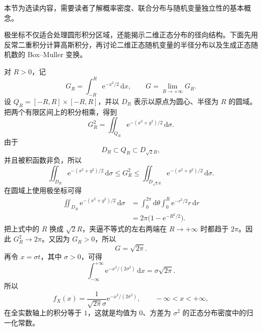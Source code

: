 \documentclass[fontset=fandol]{ctexart}
\newenvironment{extra}{\begin{mdframed}[style=extrastyle, frametitle={* 选读内容（不要求掌握）}]}{\end{mdframed}}
\newcommand{\dd}{\mathrm{d}}
\newcommand{\ee}{\mathrm{e}}
\begin{document}
\begin{extra}
本节为选读内容，需要读者了解概率密度、联合分布与随机变量独立性的基本概念。

极坐标不仅适合处理圆形积分区域，还能揭示二维正态分布的径向结构。下面先用反常二重积分计算高斯积分，再讨论二维正态随机变量的半径分布以及生成正态随机数的 Box--Muller 变换。

\begin{example}[高斯积分与正态分布的归一化常数]
对 $R>0$，记
\[
G_R=\int_{-R}^{R}\ee^{-x^2/2}\,\dd x,
\qquad
G=\lim_{R\to+\infty}G_R.
\]
设 $Q_R=[-R,R]\times[-R,R]$，并以 $D_R$ 表示以原点为圆心、半径为 $R$ 的圆域。把两个有限区间上的积分相乘，得到
\[
G_R^2
=\iint_{Q_R}\ee^{-(x^2+y^2)/2}\,\dd\sigma.
\]
由于
\[
D_R\subset Q_R\subset D_{\sqrt2R},
\]
并且被积函数非负，所以
\[
\iint_{D_R}\ee^{-(x^2+y^2)/2}\,\dd\sigma
\leq G_R^2\leq
\iint_{D_{\sqrt2R}}\ee^{-(x^2+y^2)/2}\,\dd\sigma.
\]
在圆域上使用极坐标可得
\[
\begin{aligned}
\iint_{D_R}\ee^{-(x^2+y^2)/2}\,\dd\sigma
&=\int_0^{2\pi}\dd\theta\int_0^R\ee^{-r^2/2}r\,\dd r\\
&=2\pi\bigl(1-\ee^{-R^2/2}\bigr).
\end{aligned}
\]
把上式中的 $R$ 换成 $\sqrt2R$，夹逼不等式的左右两端在 $R\to+\infty$ 时都趋于 $2\pi$。因此 $G_R^2\to2\pi$。又因为 $G_R>0$，所以
\[
\boxed{G=\sqrt{2\pi}}.
\]
再令 $x=\sigma t$，其中 $\sigma>0$，可得
\[
\int_{-\infty}^{+\infty}
\ee^{-x^2/(2\sigma^2)}\,\dd x
=\sigma\sqrt{2\pi}.
\]
所以
\[
f_X(x)=\frac{1}{\sqrt{2\pi}\sigma}
\ee^{-x^2/(2\sigma^2)},\qquad -\infty<x<+\infty,
\]
在全实数轴上的积分等于 $1$，这就是均值为 $0$、方差为 $\sigma^2$ 的正态分布密度中的归一化常数。
\end{example}


\end{extra}
\end{document}
